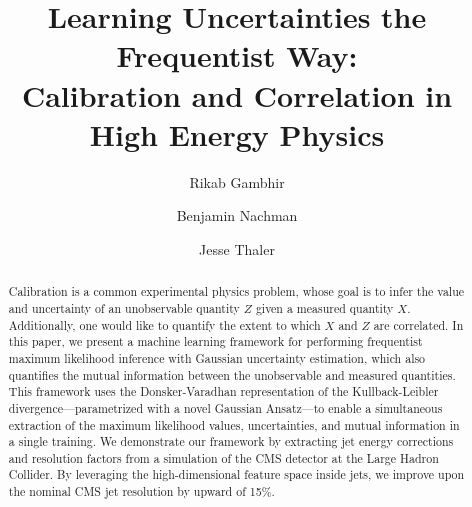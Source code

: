\documentclass[prl,twocolumn,superscriptaddress,longbibliography,preprintnumbers,floatfix,nofootinbib]{revtex4-1}
\newcommand{\GaussianAnsatz}{{Gaussian Ansatz}\xspace}
\begin{document}
\title{Learning Uncertainties the Frequentist Way:\\  Calibration and Correlation in High Energy Physics }


\author{Rikab Gambhir}

\author{Benjamin Nachman}

\author{Jesse Thaler}

\begin{abstract}
%
Calibration is a common experimental physics problem, whose goal is to infer the value and uncertainty of an unobservable quantity $Z$ given a measured quantity $X$.
%
Additionally, one would like to quantify the extent to which $X$ and $Z$ are correlated.
%
In this paper, we present a machine learning framework for performing frequentist maximum likelihood inference with Gaussian uncertainty estimation, which also quantifies the mutual information between the unobservable and measured quantities.
%
This framework uses the Donsker-Varadhan representation of the Kullback-Leibler divergence---parametrized with a novel \GaussianAnsatz---to enable a simultaneous extraction of the maximum likelihood values, uncertainties, and mutual information in a single training.
%
We demonstrate our framework by extracting jet energy corrections and resolution factors from a simulation of the CMS detector at the Large Hadron Collider.
%
By leveraging the high-dimensional feature space inside jets, we improve upon the nominal CMS jet resolution by upward of 15\%.
%
\end{abstract}


\maketitle


\end{document}
